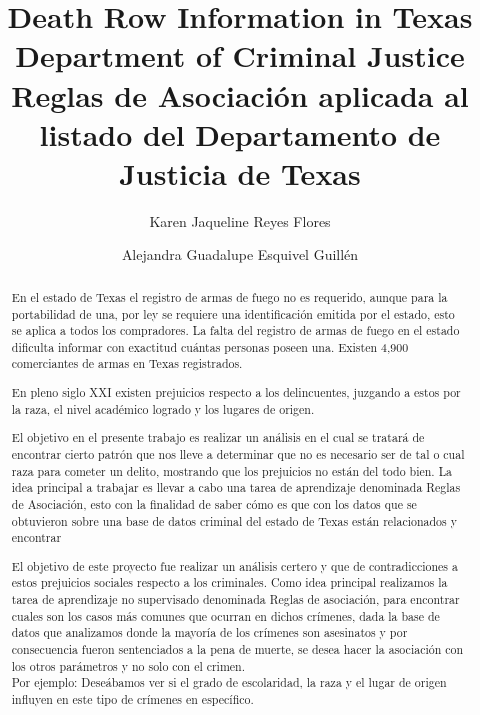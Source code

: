\documentclass[sigconf]{acmart}
\begin{document}
\title{Death Row Information in Texas Department of Criminal Justice \\ Reglas de Asociación aplicada al listado del Departamento de Justicia de Texas}
\author{Karen Jaqueline Reyes Flores}

\author{Alejandra Guadalupe Esquivel Guillén}
\renewcommand{\shortauthors}{MINERIA DE DATOS}
\renewcommand{\abstractname}{Resumen}
\begin{abstract}
En el estado de Texas el registro de armas de fuego no es requerido, aunque para la portabilidad de una, por ley se requiere una identificación emitida por el estado, esto se aplica a todos los compradores. La falta del registro de armas de fuego en el estado dificulta informar con exactitud cuántas personas poseen una. Existen 4,900 comerciantes de armas en Texas registrados.

En pleno siglo XXI existen prejuicios respecto a los delincuentes, juzgando a estos por la raza, el nivel académico logrado y los lugares de origen.

El objetivo en el presente trabajo es realizar un análisis en el cual se tratará de encontrar cierto patrón que nos lleve a determinar que no es necesario ser de tal o cual raza para cometer un delito, mostrando que los prejuicios no están del todo bien.
La idea principal a trabajar es llevar a cabo una tarea de aprendizaje denominada Reglas de Asociación, esto con la finalidad de saber cómo es que con los datos que se obtuvieron sobre una base de datos criminal del estado de Texas están relacionados y encontrar 



El objetivo de este proyecto fue realizar un análisis certero y que de contradicciones a estos prejuicios sociales respecto a los criminales. Como idea principal realizamos la tarea de aprendizaje no supervisado denominada Reglas de asociación, para encontrar cuales son los casos más comunes que ocurran en dichos crímenes, dada la base de datos que analizamos donde la mayoría de los crímenes son asesinatos y por consecuencia fueron sentenciados a la pena de muerte, se desea hacer la asociación con los otros parámetros y no solo con el crimen. \\Por ejemplo: Deseábamos ver si el grado de escolaridad, la raza y el lugar de origen influyen en este tipo de crímenes en específico.

\end{abstract}
\end{document}
